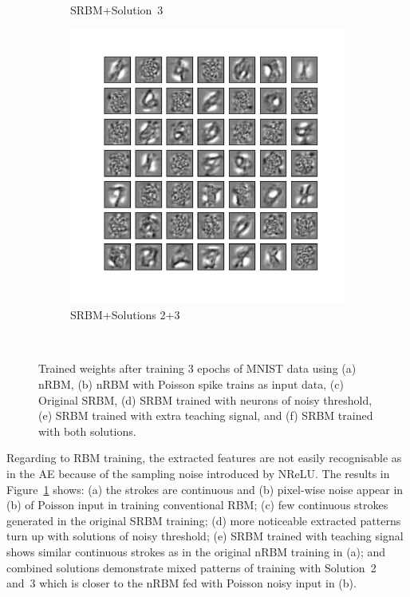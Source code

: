\begin{figure}
\begin{subfigure}[t]{0.4\textwidth}
		\caption{SRBM+Solution~3}
	\end{subfigure}
	\begin{subfigure}[t]{0.4\textwidth}
		\includegraphics[width=\textwidth]{pics_sdlm/53_MNIST_SRBM_all/2_60000_0.pdf}
		\caption{SRBM+Solutions 2+3}
	\end{subfigure}\\
	\caption{Trained weights after training 3 epochs of MNIST data using (a) nRBM, (b) nRBM with Poisson spike trains as input data, (c) Original SRBM, (d) SRBM trained with neurons of noisy threshold, (e) SRBM trained with extra teaching signal, and (f) SRBM trained with both solutions.}
	\label{fig:weights_rbm}
\end{figure}

Regarding to RBM training, the extracted features are not easily recognisable as in the AE because of the sampling noise introduced by NReLU.
The results in Figure~\ref{fig:weights_rbm} shows: (a) the strokes are continuous and (b) pixel-wise noise appear in (b) of Poisson input in training conventional RBM;
(c) few continuous strokes generated in the original SRBM training;
(d) more noticeable extracted patterns turn up with solutions of noisy threshold;
(e) SRBM trained with teaching signal shows similar continuous strokes as in the original nRBM training in (a);
and combined solutions demonstrate mixed patterns of training with Solution~2 and~3 which is closer to the nRBM fed with Poisson noisy input in (b). 


